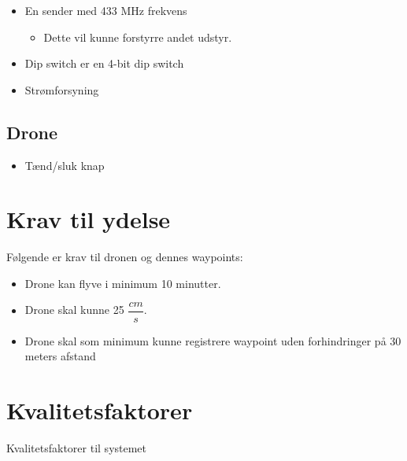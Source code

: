 \documentclass[Main]{subfiles}
\begin{document}
	\begin{itemize}
	\item En sender med 433 MHz frekvens
	
		\begin{itemize}
		\item Dette vil kunne forstyrre andet udstyr.
		\end{itemize}
	
	\item Dip switch er en 4-bit dip switch
	
	\item Strømforsyning 
	\end{itemize}
	
	
	
\subsection{Drone}

	\begin{itemize}
	\item Tænd/sluk knap
	\end{itemize}





\section{Krav til ydelse}
Følgende er krav til dronen og dennes waypoints:

	\begin{itemize}
	\item Drone kan flyve i minimum 10 minutter.
	\item Drone skal kunne 25 $\dfrac{cm}{s}$.
	\item Drone skal som minimum kunne registrere waypoint uden forhindringer på 30 meters afstand
	\end{itemize}



\section{Kvalitetsfaktorer}
Kvalitetsfaktorer til systemet
\end{document}
